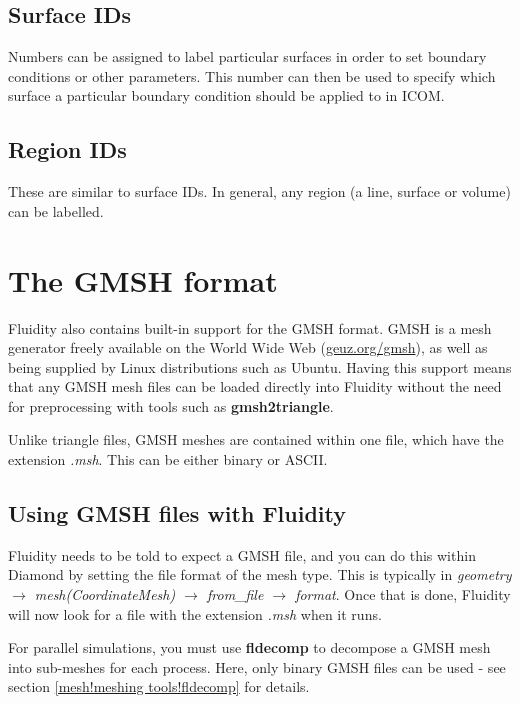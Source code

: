 \subsection{Surface IDs}\label{sect:surface_ids}
Numbers can be assigned to label particular surfaces in order to set boundary conditions or other parameters. This number can then be used to specify which surface a particular boundary condition should be applied to in ICOM.

\subsection{Region IDs}\label{sect:region_ids}
These are similar to surface IDs. In general, any region (a line, surface or volume) can be labelled.


\section{The GMSH format}\label{sect:gmsh_format}

Fluidity also contains built-in support for the GMSH format. GMSH is a mesh generator freely available on the World Wide Web (\href{http://geuz.org/gmsh/}{geuz.org/gmsh}), as well as being supplied by Linux distributions such as Ubuntu. Having this support means that any GMSH mesh files can be loaded directly into Fluidity without the need for preprocessing with tools such as \textbf{gmsh2triangle}. 

Unlike triangle files, GMSH meshes are contained within one file, which have the extension \textit{.msh}. This can be either binary or ASCII.

\subsection{Using GMSH files with Fluidity}\label{sect:using_gmsh}

Fluidity needs to be told to expect a GMSH file, and you can do this within Diamond by setting the file format of the mesh type. This is typically in \textit{geometry $\rightarrow$ mesh(CoordinateMesh)  $\rightarrow$ from\_file  $\rightarrow$ format}. Once that is done, Fluidity will now look for a file with the extension \textit{.msh} when it runs.

For parallel simulations, you must use \textbf{fldecomp} to decompose a GMSH mesh into sub-meshes for each process. Here, only binary GMSH files can be used - see
section \ref{mesh!meshing tools!fldecomp} for details.

